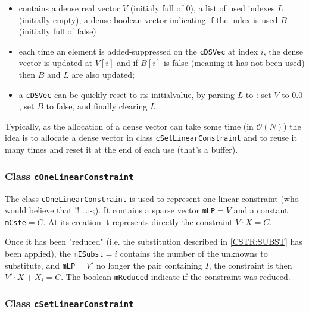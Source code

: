 \begin{itemize}
    \item  contains a dense real vector $V$ (initialy full of $0$), a list of used indexes $L$ (initially empty), a dense boolean
           vector indicating if the index is used $B$ (initially full of false) 
    \item  each time an element is added-suppressed on the {\tt cDSVec} at index $i$, the dense vector is updated 
           at $V[i]$ and if $B[i]$ is false (meaning it has not been used) then $B$ and $L$ are also updated;
    \item  a {\tt cDSVec} can be quickly reset to its initialvalue, by parsing $L$ to : set $V$ to $0.0$, set $B$ to false,
            and finally clearing $L$.
    
\end{itemize}

Typically, as the allocation of a dense vector can take some time (in  $\mathcal{O}(N)$) the idea is to allocate
a dense vector in class {\tt cSetLinearConstraint} and to reuse it many times and reset it at the end of each use
(that's a buffer).



\subsubsection{Class {\tt cOneLinearConstraint} }


The class {\tt cOneLinearConstraint} is used to represent one linear constraint (who would believe that !! \dots  :-;).
It contains a sparse vector {\tt mLP}$=V$ and a constant {\tt mCste}$=C$. At its creation it
represents directly the constraint  $V \cdot X = C$.

Once it has been "reduced" (i.e. the substitution described in  \ref{CSTR:SUBST} has been applied),
the {\tt mISubst}$=i$ contains the number of the unknowns to substitute, and {\tt mLP}$=V'$ no longer the
pair containing $I$, the constraint is then $V' \cdot X + X_i = C$.  The boolean {\tt mReduced}
indicate if the constraint was reduced.


\subsubsection{Class {\tt cSetLinearConstraint} }

